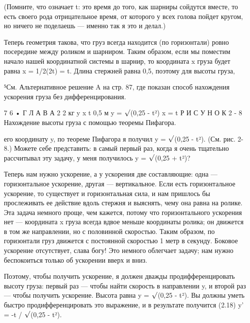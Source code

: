 \documentclass[10pt,oneside]{article}
\begin{document}
(Помните, что означает t: это время до того, как шарниры сойдутся вместе, то есть своего рода отрицательное время, от которого у всех голова пойдет кругом, но ничего не поделаешь --- именно так я это и делал.)\par

Теперь геометрия такова, что груз всегда находится (по горизонтали) ровно посередине между роликом и шарниром. Таким образом, если мы поместим начало нашей координатной системы в шарнир, то координата x груза будет равна x = 1/2(2t) = t. Длина стержней равна 0,5, поэтому для высоты груза,\par

⁵См. Альтернативное решение A на стр. 87, где показан способ нахождения ускорения груза без дифференцирования.\par

7 6 • Г Л А В А  2 2 кг y x t 0,5 м y = \ensuremath{\sqrt{\vphantom{1}}}(0,25 - t²) x = t Р И С У Н О К 2 - 8 Нахождение высоты груза с помощью теоремы Пифагора.\par

его координату y, по теореме Пифагора я получил y = \ensuremath{\sqrt{\vphantom{1}}}(0,25 - t²). (См. рис. 2-8.) Можете себе представить: в самый первый раз, когда я очень тщательно рассчитывал эту задачу, у меня получилось y = \ensuremath{\sqrt{\vphantom{1}}}(0,25 + t²)?\par

Теперь нам нужно ускорение, а у ускорения две составляющие: одна --- горизонтальное ускорение, другая --- вертикальное. Если есть горизонтальное ускорение, то существует и горизонтальная сила, и нам пришлось бы прослеживать ее действие вдоль стержня и выяснять, чему она равна на ролике. Эта задача немного проще, чем кажется, потому что горизонтального ускорения нет --- координата x груза всегда вдвое меньше координаты ролика; он движется в том же направлении, но с половинной скоростью. Таким образом, по горизонтали груз движется с постоянной скоростью 1 метр в секунду. Боковое ускорение отсутствует, слава богу! Это немного облегчает задачу; нам нужно беспокоиться только об ускорении вверх и вниз.\par

Поэтому, чтобы получить ускорение, я должен дважды продифференцировать высоту груза: первый раз --- чтобы найти скорость в направлении y, и второй раз --- чтобы получить ускорение. Высота равна y = \ensuremath{\sqrt{\vphantom{1}}}(0,25 - t²). Вы должны уметь быстро продифференцировать это выражение, и в результате получится (2.18) y' = -t / \ensuremath{\sqrt{\vphantom{1}}}(0,25 - t²).\par
\end{document}
